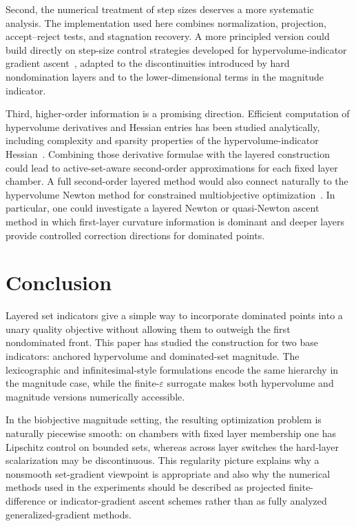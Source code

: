 \documentclass{article}
\begin{document}
Second, the numerical treatment of step sizes deserves a more systematic analysis.  The implementation used here combines normalization, projection, accept--reject tests, and stagnation recovery.  A more principled version could build directly on step-size control strategies developed for hypervolume-indicator gradient ascent~\cite{wangdeutzbackemmerich2017}, adapted to the discontinuities introduced by hard nondomination layers and to the lower-dimensional terms in the magnitude indicator.

Third, higher-order information is a promising direction.  Efficient computation of hypervolume derivatives and Hessian entries has been studied analytically, including complexity and sparsity properties of the hypervolume-indicator Hessian~\cite{deutzemmerichwang2023hessian}.  Combining those derivative formulae with the layered construction could lead to active-set-aware second-order approximations for each fixed layer chamber.  A full second-order layered method would also connect naturally to the hypervolume Newton method for constrained multiobjective optimization~\cite{wangemmerichdeutzhernandezschutze2023newton}.  In particular, one could investigate a layered Newton or quasi-Newton ascent method in which first-layer curvature information is dominant and deeper layers provide controlled correction directions for dominated points.

\section{Conclusion}
Layered set indicators give a simple way to incorporate dominated points into a unary quality objective without allowing them to outweigh the first nondominated front.  This paper has studied the construction for two base indicators: anchored hypervolume and dominated-set magnitude.  The lexicographic and infinitesimal-style formulations encode the same hierarchy in the magnitude case, while the finite-$\varepsilon$ surrogate makes both hypervolume and magnitude versions numerically accessible.

In the biobjective magnitude setting, the resulting optimization problem is naturally piecewise smooth: on chambers with fixed layer membership one has Lipschitz control on bounded sets, whereas across layer switches the hard-layer scalarization may be discontinuous.  This regularity picture explains why a nonsmooth set-gradient viewpoint is appropriate and also why the numerical methods used in the experiments should be described as projected finite-difference or indicator-gradient ascent schemes rather than as fully analyzed generalized-gradient methods.
\end{document}
